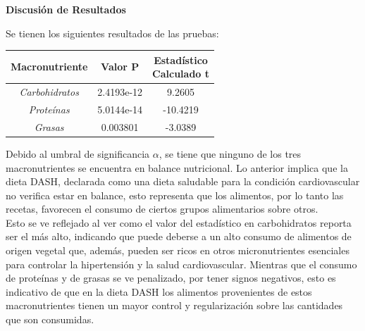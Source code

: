 \documentclass[12pt,a4paper]{article}
\begin{document}
        \textbf{Discusión de Resultados}\\
        {
            Se tienen los siguientes resultados de las pruebas:

            \begin{center}    
                \begin{tabular}{| c | c | c |}
                    \toprule
                    \textbf{Macronutriente} & \textbf{Valor P} & \makecell{\textbf{Estadístico}\\\textbf{Calculado t}} \\
                    \midrule
                    \emph{Carbohidratos} & 2.4193e-12 &   9.2605 \\
                    \emph{Proteínas}     & 5.0144e-14 & -10.4219 \\
                    \emph{Grasas}        & 0.003801   &  -3.0389 \\
                    \bottomrule
                \end{tabular}
            \end{center}

            Debido al umbral de significancia $\alpha$, se tiene que ninguno 
            de los tres macronutrientes se encuentra en balance nutricional. 
            Lo anterior implica que la dieta DASH, declarada como una dieta 
            saludable para la condición cardiovascular no verifica estar en 
            balance, esto representa que los alimentos, por lo tanto las recetas, 
            favorecen el consumo de ciertos grupos alimentarios sobre otros.\\

            Esto se ve reflejado al ver como el valor del estadístico en 
            carbohidratos reporta ser el más alto, indicando que puede deberse 
            a un alto consumo de alimentos de origen vegetal que, además, pueden 
            ser ricos en otros micronutrientes esenciales para controlar la 
            hipertensión y la salud cardiovascular. Mientras que el consumo de 
            proteínas y de grasas se ve penalizado, por tener signos negativos, 
            esto es indicativo de que en la dieta DASH los alimentos provenientes de 
            estos macronutrientes tienen un mayor control y regularización sobre 
            las cantidades que son consumidas.
        }

\newpage

{
    \printbibliography[heading=bibintoc,title={Referencias Bibliográficas}]
}
\end{document}

